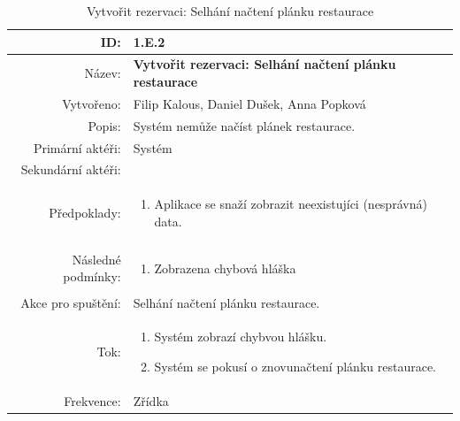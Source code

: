 \begin{center}
\begin{table}[ht!]
{\renewcommand{\arraystretch}{1.3}
\begin{tabular}{| r | p{12cm} |}
	\hline
	ID: & 1.E.2 \\
    \hline
    Název: & \textbf{Vytvořit rezervaci: Selhání načtení plánku restaurace} \\
    \hline
    Vytvořeno: & Filip Kalous, Daniel Dušek, Anna Popková \\
    \hline
    Popis: & Systém nemůže načíst plánek restaurace. \\
    \hline
    Primární aktéři: & Systém \\
    \hline
    Sekundární aktéři: &  \\
    \hline
    Předpoklady: & 
    \begin{minipage}[t]{0.75\textwidth}
    	\begin{enumerate}[nosep,after=\strut]
    		\item Aplikace se snaží zobrazit neexistujíci (nesprávná) data.
    	\end{enumerate}
  	\end{minipage} \\
    \hline
    Následné podmínky: & 
    \begin{minipage}[t]{0.75\textwidth}
    	\begin{enumerate}[nosep,after=\strut]
    		\item Zobrazena chybová hláška
    	\end{enumerate}
  	\end{minipage} \\
	\hline
    Akce pro spuštění: & Selhání načtení plánku restaurace. \\
    \hline
    Tok: & 
    \begin{minipage}[t]{0.75\textwidth}
    	\begin{enumerate}[nosep,after=\strut]
        	\item Systém zobrazí chybvou hlášku.
            \item Systém se pokusí o znovunačtení plánku restaurace.
    	\end{enumerate}
  	\end{minipage} \\
    \hline
    Frekvence: & Zřídka \\
    \hline

\end{tabular}}
\caption{Vytvořit rezervaci: Selhání načtení plánku restaurace}
\label{table:3}
\end{table}
\end{center}
